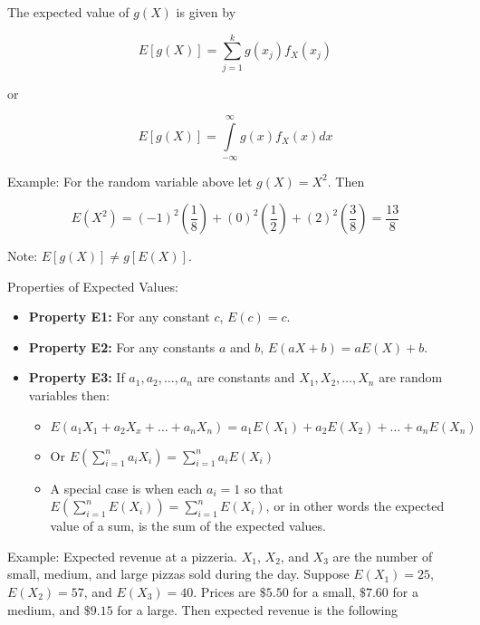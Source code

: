 \documentclass[11pt]{article}
\begin{document}
The expected value of $g(X)$ is given by

\begin{equation*}
E[g(X)] = \sum\limits_{j=1}^{k} g(x_{j}) f_{X}(x_{j})
\end{equation*}

or

\begin{equation*}
E[g(X)] = \int\limits_{-\infty}^{\infty} g(x)f_{X}(x)dx
\end{equation*}

\vspace{2mm}

Example: For the random variable above let $g(X) = X^{2}$. Then 

\begin{equation*}
E(X^{2}) = (-1)^{2}(\frac{1}{8}) + (0)^{2}(\frac{1}{2}) + (2)^{2}(\frac{3}{8}) = \frac{13}{8}
\end{equation*}

Note: $E[g(X)] \neq g[E(X)]$.

\vspace{2mm}

Properties of Expected Values:

\begin{itemize}
 \item[] \textbf{Property E1:} For any constant $c$, $E(c) = c$.
 \item[] \textbf{Property E2:} For any constants $a$ and $b$, $E(aX + b) = aE(X) + b$.
 \item[] \textbf{Property E3:} If ${a_{1}, a_{2}, \ldots, a_{n}}$ are constants and ${X_{1}, X_{2}, \ldots, X_{n}}$ are
      random variables then:
 \begin{itemize}
  \item $E(a_{1}X_{1} + a_{2}X_{x} + \ldots + a_{n}X_{n}) = a_{1}E(X_{1}) + a_{2}E(X_{2}) + \ldots + a_{n}E(X_{n})$
  \item Or $E(\sum\limits_{i=1}^{n} a_{i}X_{i}) = \sum\limits_{i=1}^{n} a_{i}E(X_{i})$
  \item A special case is when each $a_{i} = 1$ so that
          $E(\sum\limits_{i=1}^{n} E(X_{i})) = \sum\limits_{i=1}^{n} E(X_{i})$, or in other words the expected value
          of a sum, is the sum of the expected values.
 \end{itemize}
\end{itemize}

\vspace{2mm}

Example: Expected revenue at a pizzeria. $X_{1}$, $X_{2}$, and $X_{3}$ are the number of small, medium, and large
pizzas sold during the day. Suppose $E(X_{1}) = 25$, $E(X_{2}) = 57$, and $E(X_{3}) = 40$. Prices are $\$5.50$ for
a small, $\$7.60$ for a medium, and $\$9.15$ for a large. Then expected revenue is the following 
\end{document}
